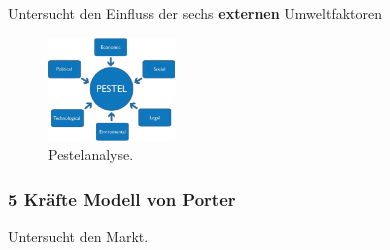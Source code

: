 \documentclass{article}
\begin{document}
Untersucht den Einfluss der sechs \textbf{externen} Umweltfaktoren \\
\begin{figure}
\centering
\includegraphics[width=0.3\textwidth]{Resources/Image/Pestelanalyse.png}
\caption{\label{fig:Pestelanalyse}Pestelanalyse.}
\end{figure}




\subsubsection{5 Kräfte Modell von Porter}

Untersucht den Markt. \\





























\end{document}
